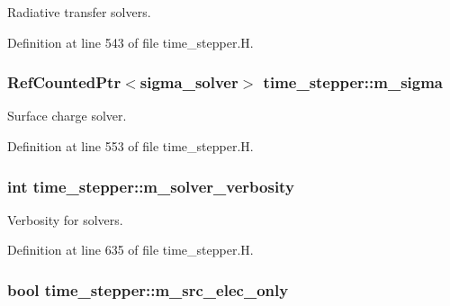 Radiative transfer solvers. 



Definition at line 543 of file time\+\_\+stepper.\+H.

\subsubsection[{\texorpdfstring{m\+\_\+sigma}{m_sigma}}]{\setlength{\rightskip}{0pt plus 5cm}Ref\+Counted\+Ptr$<${\bf sigma\+\_\+solver}$>$ time\+\_\+stepper\+::m\+\_\+sigma\hspace{0.3cm}{\ttfamily [protected]}}\hypertarget{classtime__stepper_aec0c61822a3a3bb1b4cdc06a6eaf1d5d}{}\label{classtime__stepper_aec0c61822a3a3bb1b4cdc06a6eaf1d5d}


Surface charge solver. 



Definition at line 553 of file time\+\_\+stepper.\+H.

\subsubsection[{\texorpdfstring{m\+\_\+solver\+\_\+verbosity}{m_solver_verbosity}}]{\setlength{\rightskip}{0pt plus 5cm}int time\+\_\+stepper\+::m\+\_\+solver\+\_\+verbosity\hspace{0.3cm}{\ttfamily [protected]}}\hypertarget{classtime__stepper_a0f30ea8c9bc55972e9a28d9e5d4881f8}{}\label{classtime__stepper_a0f30ea8c9bc55972e9a28d9e5d4881f8}


Verbosity for solvers. 



Definition at line 635 of file time\+\_\+stepper.\+H.

\subsubsection[{\texorpdfstring{m\+\_\+src\+\_\+elec\+\_\+only}{m_src_elec_only}}]{\setlength{\rightskip}{0pt plus 5cm}bool time\+\_\+stepper\+::m\+\_\+src\+\_\+elec\+\_\+only\hspace{0.3cm}{\ttfamily [protected]}}\hypertarget{classtime__stepper_a86913b145d2b6ad0442b6341e39f754d}{}\label{classtime__stepper_a86913b145d2b6ad0442b6341e39f754d}


